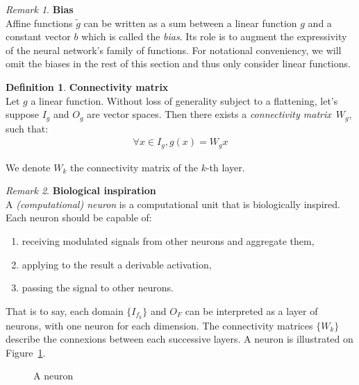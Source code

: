 \documentclass{article}
\theoremstyle{definition}
\newtheorem{definition}{Definition}[section]
\theoremstyle{remark}
\newtheorem{remark}{Remark}[section]
\theoremstyle{plain}
\newcommand{\ovec}{}
\begin{document}
\begin{remark}\textbf{Bias}\\
Affine functions $\widetilde{g}$ can be written as a sum between a linear function $g$ and a constant vector $b$ which is called the \emph{bias}. Its role is to augment the expressivity of the neural network's family of functions. For notational conveniency, we will omit the biases in the rest of this section and thus only consider linear functions.
\end{remark}

\begin{definition}\textbf{Connectivity matrix}\\
Let $g$ a linear function. Without loss of generality subject to a flattening, let's suppose $I_g$ and $O_g$ are vector spaces. Then there exists a \emph{connectivity matrix}~$W_g$, such that:
\begin{gather*}
\forall \ovec{x} \in I_g, g(\ovec{x}) = W_g\ovec{x}
\end{gather*}
\end{definition}
We denote $W_k$ the connectivity matrix of the $k$-th layer.

\begin{remark}\textbf{Biological inspiration}\\
A \emph{(computational) neuron} is a computational unit that is biologically inspired. Each neuron should be capable of:
\begin{enumerate}
\item receiving modulated signals from other neurons and aggregate them,
\item applying to the result a derivable activation,
\item passing the signal to other neurons.
\end{enumerate}
That is to say, each domain $\{I_{f_k}\}$ and $O_F$ can be interpreted as a layer of neurons, with one neuron for each dimension. The connectivity matrices $\{W_k\}$ describe the connexions between each successive layers.
A neuron is illustrated on Figure~\ref{fig:neuron}.
\end{remark}

\begin{figure}[H]
\centering
{}
\caption{A neuron}
\label{fig:neuron}
\end{figure}
\end{document}
